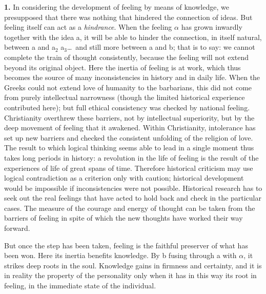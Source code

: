 \documentclass[12pt,a4paper]{book}
\newcommand{\opage}[1]{\marginnote{\footnotesize\textit{[#1]}}}
\begin{document}
\textbf{1.} In considering the development of feeling by means of
knowledge, we presupposed that there was nothing that hindered the
connection of ideas. But feeling itself can act as a \emph{hindrance}.
When the feeling $\alpha$ has grown inwardly together with the idea a,
it will be able to hinder the connection, in itself natural, between a
and a$_{2}$ a$_{3}$\ldots\ and still more between a and b; that is to
say: we cannot complete the train of thought consistently, because the
feeling will not extend beyond its original object. Here the inertia of
feeling is at work, which thus becomes the source of many
inconsistencies in history and in daily life. When the Greeks could not
extend love of humanity to the barbarians, this did not come from purely
intellectual narrowness (though the limited historical experience
contributed here); but full ethical consistency was checked by national
feeling. Christianity overthrew these barriers, not by intellectual
superiority, but by the deep movement of feeling that it awakened.
Within Christianity, intolerance has set up new barriers and checked the
consistent unfolding of the religion of love. The result to which
logical thinking seems able to lead in a single moment thus takes long
periods in history: a revolution in the life of feeling is the result
of the experiences of life of great spans of time. Therefore historical
criticism may use logical contradiction as a criterion only with
caution; historical development would be impossible if inconsistencies
were not possible. Historical research has to seek out the real
feelings that have acted to hold back and check in the particular cases.
The measure of the courage and energy of thought can be taken from
\opage{353}the barriers of feeling in spite of which the new thoughts
have worked their way forward.

But once the step has been taken, feeling is the faithful preserver of
what has been won. Here its inertia benefits knowledge. By b fusing
through a with $\alpha$, it strikes deep roots in the soul. Knowledge
gains in firmness and certainty, and it is in reality the property of
the personality only when it has in this way its root in feeling, in
the immediate state of the individual.
\end{document}
